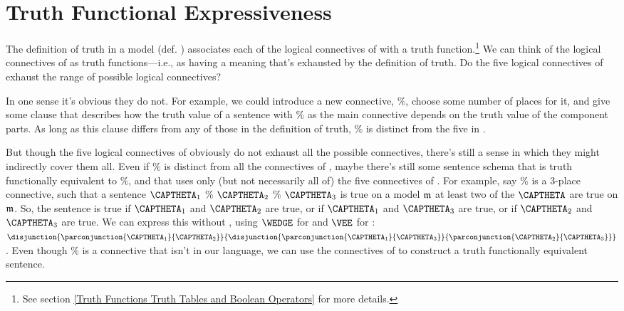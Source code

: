 \section[Truth Functional Expressiveness]{Truth Functional Expressiveness}\label{Truth Functional Expressiveness} 


The definition of truth in a model (def. ) associates each of the logical connectives of \GSL{} with a truth function.\footnote{See section \ref{Truth Functions Truth Tables and Boolean Operators} for more details.}
We can think of the logical connectives of \GSL{} as truth functions---i.e., as having a meaning that's exhausted by the definition of truth. 
Do the five logical connectives of \GSL{} exhaust the range of possible logical connectives?

In one sense it's obvious they do not. 
For example, we could introduce a new connective, $\%$, choose some number of places for it, and give some clause that describes how the truth value of a sentence with $\%$ as the main connective depends on the truth value of the component parts. 
As long as this clause differs from any of those in the definition of truth, $\%$ is distinct from the five in \GSL{}.

But though the five logical connectives of \GSL{} obviously do not exhaust all the possible connectives, there's still a sense in which they might indirectly cover them all. 
Even if $\%$ is distinct from all the connectives of \GSL{}, maybe there's still some sentence schema that is truth functionally equivalent to $\%$, and that uses only (but not necessarily all of) the five connectives of \GSL{}. 
For example, say $\%$ is a 3-place connective, such that a sentence $\CAPTHETA_1$ $\%$ $\CAPTHETA_2$ $\%$ $\CAPTHETA_3$ is true on a model $\mathfrak{m}$ \Iff at least two of the $\CAPTHETA$ are true on $\mathfrak{m}$.  So, the sentence is true if $\CAPTHETA_1$ and $\CAPTHETA_2$ are true, or if $\CAPTHETA_1$ and $\CAPTHETA_3$ are true, or if $\CAPTHETA_2$ and $\CAPTHETA_3$ are true.  We can express this without \mention{$\%$}, using $\WEDGE$ for  and $\VEE$ for :  $\disjunction{\parconjunction{\CAPTHETA_1}{\CAPTHETA_2}}{\disjunction{\parconjunction{\CAPTHETA_1}{\CAPTHETA_3}}{\parconjunction{\CAPTHETA_2}{\CAPTHETA_3}}}$.  Even though $\%$ is a connective that isn't in our language, we can use the connectives of \GSL{} to construct a truth functionally equivalent sentence. 


